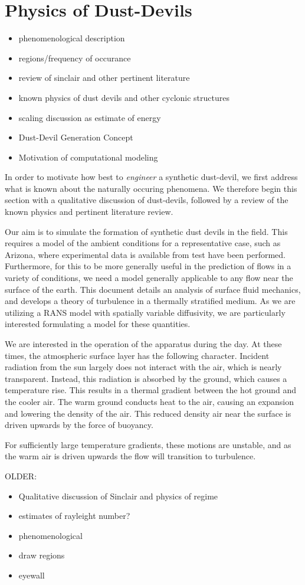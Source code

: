 \section{Physics of Dust-Devils}
\label{sec:physics}
\begin{itemize}
\item phenomenological description
\item regions/frequency of occurance
\item review of sinclair and other pertinent literature
\item known physics of dust devils and other cyclonic structures
\item scaling discussion as estimate of energy
\item Dust-Devil Generation Concept
\item Motivation of computational modeling
\end{itemize}

In order to motivate how best to \textit{engineer} a synthetic
dust-devil, we first address what is known about the naturally occuring
phenomena. We therefore begin this section with a qualitative discussion
of dust-devils, followed by a review of the known physics and pertinent 
literature review. 

Our aim is to simulate the formation of synthetic dust devils in the
field. This requires a model of the ambient conditions for a
representative case, such as Arizona, where experimental data is
available from test have been performed. Furthermore, for this to be
more generally useful in the prediction of flows in a variety of
conditions, we need a model generally applicable to any flow near the
surface of the earth.  
%
%
This document details an analysis of surface fluid mechanics, and
develops a theory of turbulence in a thermally stratified medium. As we
are utilizing a RANS model with spatially variable diffusivity, we are
particularly interested formulating a model for these quantities. 

We are interested in the operation of the apparatus during the day. 
At these times, the atmospheric surface layer has the following character. 
Incident radiation from the sun largely does not interact with the
air, which is nearly transparent. Instead, this radiation is absorbed by
the ground, which causes a temperature rise. This results in a thermal
gradient between the hot ground and the cooler air. The warm ground
conducts heat to the air, causing an expansion and lowering the density
of the air. This reduced density air near the surface is driven upwards
by the force of buoyancy.  

For sufficiently large temperature gradients, these motions are
unstable, and as the warm air is driven upwards the flow will transition
to turbulence. 

OLDER:
\begin{itemize}
\item Qualitative discussion of Sinclair and physics of regime
\item estimates of rayleight number?
\item phenomenological 
\item draw regions
\item eyewall
\end{itemize}
